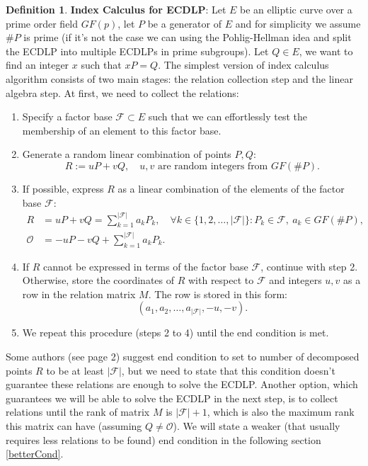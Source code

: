 \documentclass[thesis=M,english]{FITthesis}[2012/10/20]
\theoremstyle{remark}
\theoremstyle{definition}
\newtheorem{DF}{Definition}[section]
\begin{document}
\begin{DF}
\textbf{Index Calculus for ECDLP}: Let $E$ be an elliptic curve over a prime order field $GF(p)$, let $P$ be a generator of $E$ and for simplicity we assume $\#P$ is prime (if it's not the case we can using the Pohlig-Hellman idea and split the ECDLP into multiple ECDLPs in prime subgroups). Let $Q \in E$, we want to find an integer $x$ such that $xP = Q$. The simplest version of index calculus algorithm consists of two main stages: the relation collection step and the linear algebra step. At first, we need to collect the relations:
\begin{enumerate}
\item Specify a factor base $\mathcal{F} \subset E$ such that we can effortlessly test the membership of an element to this factor base. 
\item Generate a random linear combination of points $P,Q$: 
$$
R := uP + vQ,\quad \text{$u,v$ are random integers from $GF(\#P)$}.
$$
\item If possible, express $R$ as a linear combination of the elements of the factor base $\mathcal{F}$:
\begin{align*}
R &= uP + vQ = \sum_{k=1}^{|\mathcal{F}|}a_k P_k,\quad \forall k \in \{1,2,\ldots,|\mathcal{F}|\}: P_k \in \mathcal{F},\ a_k \in GF(\#P), \\
\mathcal{O} &= -uP - vQ + \sum_{k=1}^{|\mathcal{F}|}a_k P_k.
\end{align*}
\item If $R$ cannot be expressed in terms of the factor base $\mathcal{F}$, continue with step 2. Otherwise, store the coordinates of $R$ with respect to $\mathcal{F}$ and integers $u,v$ as a row in the relation matrix $M$. The row is stored in this form:
$$
(a_1, a_2, \ldots, a_{|\mathcal{F}|}, -u, -v).
$$
\item We repeat this procedure (steps 2 to 4) until the end condition is met.
\end{enumerate}
\noindent Some authors (see \cite{amadori17} page 2) suggest end condition to set to number of decomposed points $R$ to be at least $|\mathcal{F}|$, but we need to state that this condition doesn't guarantee these relations are enough to solve the ECDLP. Another option, which guarantees we will be able to solve the ECDLP in the next step, is to collect relations until the rank of matrix $M$ is $|\mathcal{F}| + 1$, which is also the maximum rank this matrix can have (assuming $Q \neq \mathcal{O}$). We will state a weaker (that usually requires less relations to be found) end condition in the following section \ref{betterCond}. \\ \\

\end{DF}
\end{document}
